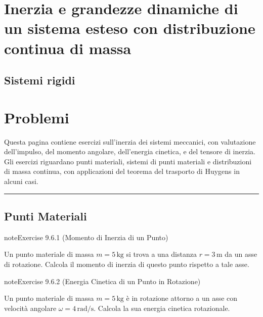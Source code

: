 \documentclass[letterpaper,10pt,italian]{jupyterBook}
\begin{document}
\section{Inerzia e grandezze dinamiche di un sistema esteso con distribuzione continua di massa}
\label{\detokenize{ch/mechanics/inertia-continuum:inerzia-e-grandezze-dinamiche-di-un-sistema-esteso-con-distribuzione-continua-di-massa}}\label{\detokenize{ch/mechanics/inertia-continuum::doc}}

\subsection{Sistemi rigidi}
\label{\detokenize{ch/mechanics/inertia-continuum:sistemi-rigidi}}
\sphinxstepscope


\section{Problemi}
\label{\detokenize{ch/mechanics/inertia-problems:problemi}}\label{\detokenize{ch/mechanics/inertia-problems::doc}}
\sphinxAtStartPar
Questa pagina contiene esercizi sull’inerzia dei sistemi meccanici, con valutazione dell’impulso, del momento angolare, dell’energia cinetica, e del tensore di inerzia. Gli esercizi riguardano punti materiali, sistemi di punti materiali e distribuzioni di massa continua, con applicazioni del teorema del trasporto di Huygens in alcuni casi.


\bigskip\hrule\bigskip



\subsection{Punti Materiali}
\label{\detokenize{ch/mechanics/inertia-problems:punti-materiali}} \label{exercise:ch/mechanics/inertia-problems-exercise-0}

\begin{sphinxadmonition}{note}{Exercise 9.6.1 (Momento di Inerzia di un Punto)}



\sphinxAtStartPar
Un punto materiale di massa \(m = 5 \, \text{kg}\) si trova a una distanza \(r = 3 \, \text{m}\) da un asse di rotazione. Calcola il momento di inerzia di questo punto rispetto a tale asse.
\end{sphinxadmonition}
 \label{exercise:ch/mechanics/inertia-problems-exercise-1}

\begin{sphinxadmonition}{note}{Exercise 9.6.2 (Energia Cinetica di un Punto in Rotazione)}



\sphinxAtStartPar
Un punto materiale di massa \(m = 5 \, \text{kg}\) è in rotazione attorno a un asse con velocità angolare \(\omega = 4 \, \text{rad/s}\). Calcola la sua energia cinetica rotazionale.
\end{sphinxadmonition}
 \label{exercise:ch/mechanics/inertia-problems-exercise-2}
\end{document}
